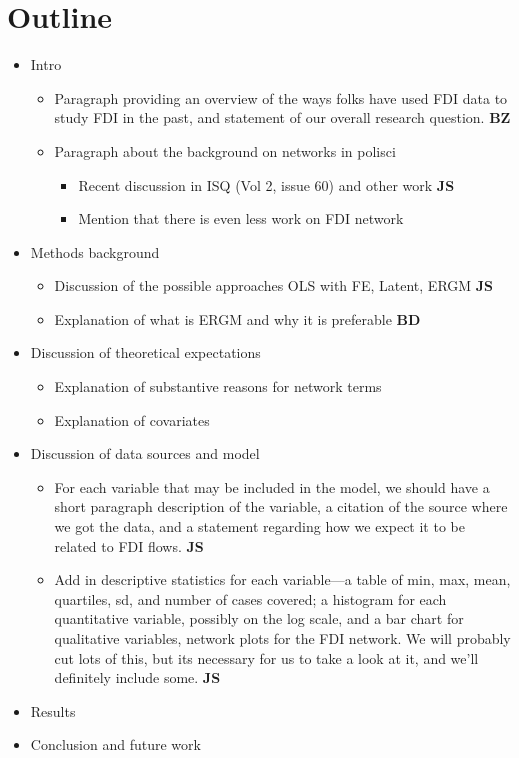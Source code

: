 \documentclass{article}
\begin{document}
\section{Outline}
\begin{itemize}
  \item Intro
    \begin{itemize}
    \item Paragraph providing an overview of the ways folks have used FDI data to study FDI in the past, and statement of our overall research question. {\bf BZ}
      \item Paragraph about the background on networks in polisci 
     	 \begin{itemize}
      	\item Recent discussion in ISQ (Vol 2, issue 60) and other work {\bf JS}
      	\item Mention that there is even less work on FDI network 
      	\end{itemize}
    \end{itemize}
  \item Methods background 
   \begin{itemize}
      	\item Discussion of the possible approaches OLS with FE, Latent, ERGM {\bf JS}
      	\item Explanation of what is ERGM and why it is preferable {\bf BD}
      	\end{itemize}
  \item{Discussion of theoretical expectations}
  \begin{itemize}
      	\item{Explanation of substantive reasons for network terms}
      	\item{Explanation of covariates}
      	\end{itemize}
   \item{Discussion of data sources and model}
   \begin{itemize}
   \item For each variable that may be included in the model, we should have a short paragraph description of the variable, a citation of the source where we got the data, and a statement regarding how we expect it to be related to FDI flows. {\bf JS}
   \item Add in descriptive statistics for each variable---a table of min, max, mean, quartiles, sd, and number of cases covered; a histogram for each quantitative variable, possibly on the log scale, and a bar chart for qualitative variables, network plots for the FDI network. We will probably cut lots of this, but its necessary for us to take a look at it, and we'll definitely include some. {\bf JS}
   \end{itemize}
     \item{Results}
     \item{Conclusion and future work}
\end{itemize}
\end{document}
